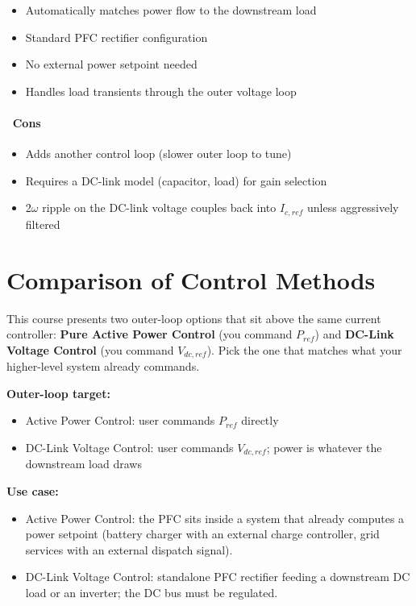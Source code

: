 \documentclass[11pt]{article}
\providecommand{\xmark}{\texorpdfstring{{\color{red}\ding{55}}\,}{[-] }}
\providecommand{\tightlist}{%
      \setlength{\itemsep}{0pt}\setlength{\parskip}{0pt}}
\begin{document}
\begin{itemize}
\tightlist
\item
  Automatically matches power flow to the downstream load
\item
  Standard PFC rectifier configuration
\item
  No external power setpoint needed
\item
  Handles load transients through the outer voltage loop
\end{itemize}

\hypertarget{cons-dc-voltage}{%
\paragraph{\xmark{} Cons}\label{cons-dc-voltage}}

\begin{itemize}
\tightlist
\item
  Adds another control loop (slower outer loop to tune)
\item
  Requires a DC-link model (capacitor, load) for gain selection
\item
  2\(\omega\) ripple on the DC-link voltage couples back into
  \(I_{c,ref}\) unless aggressively filtered
\end{itemize}

    \hypertarget{comparison-of-control-methods}{%
\section{Comparison of Control
Methods}\label{comparison-of-control-methods}}

    This course presents two outer-loop options that sit above the same
current controller: \textbf{Pure Active Power Control} (you command
\(P_{ref}\)) and \textbf{DC-Link Voltage Control} (you command
\(V_{dc,ref}\)). Pick the one that matches what your higher-level
system already commands.

\textbf{Outer-loop target:}
\begin{itemize}
\tightlist
\item Active Power Control: user commands \(P_{ref}\) directly
\item DC-Link Voltage Control: user commands \(V_{dc,ref}\); power is
  whatever the downstream load draws
\end{itemize}

\textbf{Use case:}
\begin{itemize}
\tightlist
\item Active Power Control: the PFC sits inside a system that already
  computes a power setpoint (battery charger with an external charge
  controller, grid services with an external dispatch signal).
\item DC-Link Voltage Control: standalone PFC rectifier feeding a
  downstream DC load or an inverter; the DC bus must be regulated.
\end{itemize}
\end{document}

